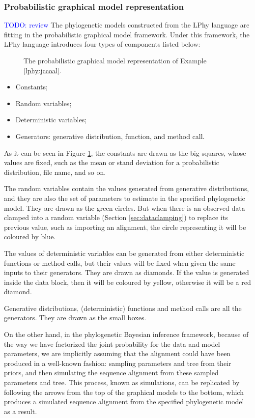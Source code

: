 \documentclass[10pt,letterpaper,table]{article}
\begin{document}
{\subsubsection{Probabilistic graphical model representation}
\textcolor{blue}{TODO: review}
The phylogenetic models constructed from the LPhy language are fitting in the probabilistic graphical model framework\cite{}.
Under this framework, the LPhy language introduces four types of components listed below:

\begin{figure}
  \caption{The probabilistic graphical model representation of Example \ref{lphy:jccoal}.} 
  \label{fig:jccoalPGM}
\end{figure}

\begin{itemize}
    \item Constants;
    \item Random variables;
    \item Deterministic variables;
    \item Generators: generative distribution, function, and method call.
\end{itemize}

As it can be seen in Figure \ref{fig:jccoalPGM}, the constants are drawn as the big squares, whose values are fixed, such as the mean or stand deviation for a probabilistic distribution, file name, and so on. 

The random variables contain the values generated from generative distributions, and they are also the set of parameters to estimate in the specified phylogenetic model. They are drawn as the green circles. 
But when there is an observed data clamped into a random variable (Section \ref{sec:dataclamping}) to replace its previous value, such as importing an alignment, the circle representing it will be coloured by blue.

The values of deterministic variables can be generated from either deterministic functions or method calls, but their values will be fixed when given the same inputs to their generators. They are drawn as diamonds. If the value is generated inside the data block, then it will be coloured by yellow, otherwise it will be a red diamond.

Generative distributions, (deterministic) functions and method calls are all the generators. They are drawn as the small boxes.

On the other hand, in the phylogenetic Bayesian inference framework, because of the way we have factorized the joint probability for the data and model parameters, we are implicitly assuming that the alignment could have been produced in a well-known fashion: sampling parameters and tree from their priors, and then simulating the sequence alignment from these sampled parameters and tree. 
This process, known as simulations, can be replicated by following the arrows from the top of the graphical models to the bottom,
which produces a simulated sequence alignment from the specified phylogenetic model as a result.

}
\end{document}
